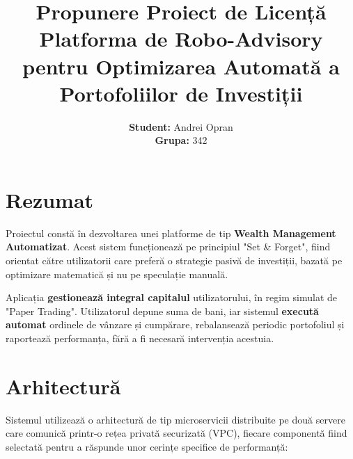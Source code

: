 \documentclass[12pt, a4paper]{article}
\title{\textbf{Propunere Proiect de Licență} \\ \vspace{0.5cm} \Large Platforma de Robo-Advisory pentru Optimizarea Automată a Portofoliilor de Investiții}
\author{\textbf{Student:} Andrei Opran \\ \textbf{Grupa:} 342}
\date{}
\begin{document}
\maketitle
\vspace{1cm}

\section{Rezumat}
Proiectul constă în dezvoltarea unei platforme de tip \textbf{Wealth Management Automatizat}. Acest sistem funcționează pe principiul "Set \& Forget", fiind orientat către utilizatorii care preferă o strategie pasivă de investiții, bazată pe optimizare matematică și nu pe speculație manuală.

Aplicația \textbf{gestionează integral capitalul} utilizatorului, în regim simulat de "Paper Trading". Utilizatorul depune suma de bani, iar sistemul \textbf{execută automat} ordinele de vânzare și cumpărare, rebalansează periodic portofoliul și raportează performanța, fără a fi necesară intervenția acestuia.

\section{Arhitectură}
Sistemul utilizează o arhitectură de tip microservicii distribuite pe două servere care comunică printr-o rețea privată securizată (VPC), fiecare componentă fiind selectată pentru a răspunde unor cerințe specifice de performanță:
\end{document}
